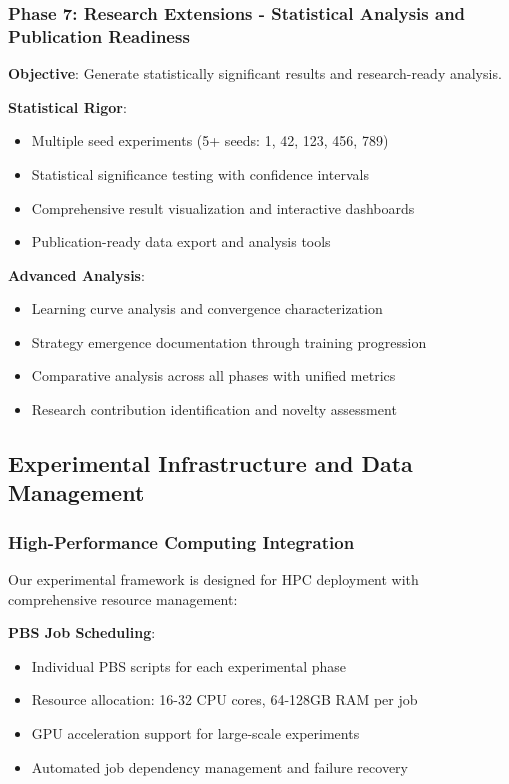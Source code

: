 \documentclass[11pt]{article}
\newcounter{phase}[algorithm]
\theoremstyle{definition}
\theoremstyle{plain}
\begin{document}
\subsubsection{Phase 7: Research Extensions - Statistical Analysis and Publication Readiness}
\textbf{Objective}: Generate statistically significant results and research-ready analysis.

\textbf{Statistical Rigor}:
\begin{itemize}
\item Multiple seed experiments (5+ seeds: 1, 42, 123, 456, 789)
\item Statistical significance testing with confidence intervals
\item Comprehensive result visualization and interactive dashboards
\item Publication-ready data export and analysis tools
\end{itemize}

\textbf{Advanced Analysis}:
\begin{itemize}
\item Learning curve analysis and convergence characterization
\item Strategy emergence documentation through training progression
\item Comparative analysis across all phases with unified metrics
\item Research contribution identification and novelty assessment
\end{itemize}

\subsection{Experimental Infrastructure and Data Management}

\subsubsection{High-Performance Computing Integration}
Our experimental framework is designed for HPC deployment with comprehensive resource management:

\textbf{PBS Job Scheduling}:
\begin{itemize}
\item Individual PBS scripts for each experimental phase
\item Resource allocation: 16-32 CPU cores, 64-128GB RAM per job
\item GPU acceleration support for large-scale experiments
\item Automated job dependency management and failure recovery
\end{itemize}
\end{document}
